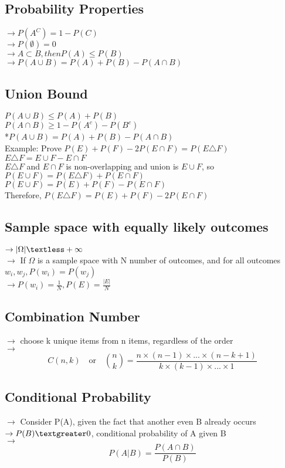\documentclass{article}
\begin{document}
\subsection{Probability Properties}
$\rightarrow P(A^C) = 1-P(C)$\\
$\rightarrow P(\emptyset)=0$\\
$\rightarrow A \subset B, then P(A) \leq P(B)$\\
$\rightarrow P(A \cup B) = P(A)+P(B)-P(A \cap B)$\\
\subsection{Union Bound}
$P(A \cup B) \leq P(A) +P(B)$ \\
$P(A \cap B) \geq 1-P(A^c) - P(B^c) $ \\
*$P(A \cup B) = P(A) + P(B) -P(A \cap B)$ \\
Example: Prove $P(E)+P(F)-2P(E \cap F) = P(E \triangle F)$ \\
$ E \triangle F = E \cup F - E\cap F$ \\
$E \triangle F$ and $E \cap F$ is non-overlapping and union is $E \cup F$, so $P(E \cup F) = P(E \triangle F) + P(E \cap F)$ \\
$P(E \cup F) = P(E) +P(F) -P(E \cap F)$ \\
Therefore, $P(E \triangle F) = P(E) +P(F) -2P(E \cap F)$ \\
\subsection{Sample space with equally likely outcomes}
$\rightarrow |\Omega| \textless + \infty $\\
$\rightarrow$ If $\Omega$ is a sample space with N number of outcomes, and for all outcomes $w_i,w_j,P(w_i) = P(w_j)$\\
$\rightarrow P(w_i) = \frac{1}{N}, P(E) = \frac{|E|}{N}$
\subsection{Combination Number}
$\rightarrow$ choose k unique items from n items, regardless of the order \\
$\rightarrow$\[ C(n,k) \quad \text{or} \quad \binom{n}{k} =\frac{n \times (n-1) \times ... \times (n-k+1)}{k \times (k-1) \times ... \times 1}\]
\subsection{Conditional Probability}
$\rightarrow$ Consider P(A), given the fact that another even B already occurs \\
$\rightarrow P(B) \textgreater 0$, conditional probability of A given B \\
$\rightarrow$\[ P(A|B) = \frac{P(A \cap B)}{P(B)}\] \\
\end{document}
